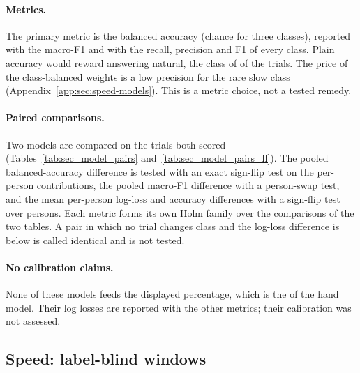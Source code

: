 \paragraph{Metrics.} The primary metric is the balanced accuracy (chance  for three
classes), reported with the macro-F1 and with the recall, precision and F1 of every class. Plain accuracy would
reward answering natural, the class of  of the  trials. The price of the
class-balanced weights is a low precision for the rare slow class (Appendix~\ref{app:sec:speed-models}). This is
a metric choice, not a tested remedy.

\paragraph{Paired comparisons.} Two models are compared on the trials both scored
(Tables~\ref{tab:sec_model_pairs} and~\ref{tab:sec_model_pairs_ll}). The pooled balanced-accuracy difference is
tested with an exact sign-flip test on the per-person contributions, the pooled macro-F1 difference with a
person-swap test, and the mean per-person log-loss and accuracy differences with a sign-flip test over persons.
Each metric forms its own Holm family over the  comparisons of the two tables. A pair in which
no trial changes class and the log-loss difference is below  is called identical and is not
tested.

\paragraph{No calibration claims.} None of these models feeds the displayed percentage, which is the \pright{}
of the hand model. Their log losses are reported with the other metrics; their calibration was not assessed.


\FloatBarrier
\subsection{Speed: label-blind windows}\label{app:sec:segmentation}

